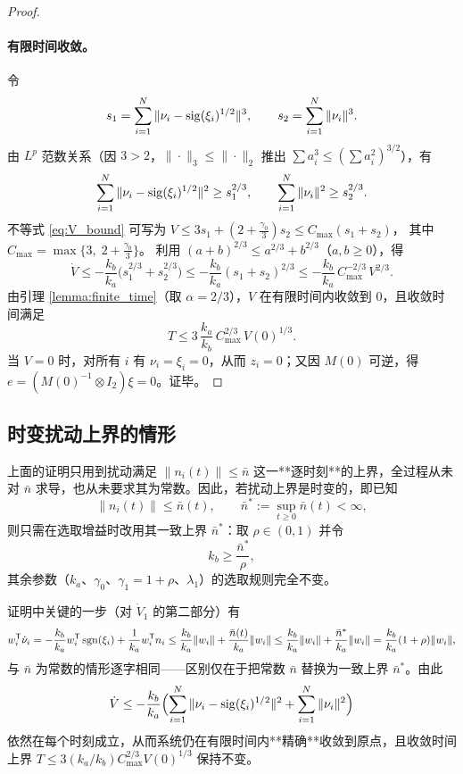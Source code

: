 \begin{proof}
    \paragraph{有限时间收敛。}
    令
    \[
        s_1 = \sum_{i=1}^{N}\|\nu_i - \operatorname{sig}(\xi_i)^{1/2}\|^3,
        \qquad
        s_2 = \sum_{i=1}^{N}\|\nu_i\|^3 .
    \]
    由 $L^p$ 范数关系（因 $3>2$，$\|\cdot\|_3\le \|\cdot\|_2$ 推出 $\sum a_i^3 \le (\sum a_i^2)^{3/2}$），有
    \[
    \sum_{i=1}^{N}\|\nu_i - \operatorname{sig}(\xi_i)^{1/2}\|^2 \ge s_1^{2/3},\qquad 
    \sum_{i=1}^{N}\|\nu_i\|^2 \ge s_2^{2/3}.
    \]
    不等式 \eqref{eq:V_bound} 可写为 $V \le 3 s_1 + (2+\frac{\gamma_0}{3}) s_2 \le C_{\max}(s_1+s_2)$，
    其中 $C_{\max} = \max\{3,\;2+\frac{\gamma_0}{3}\}$。
    利用 $(a+b)^{2/3} \le a^{2/3}+b^{2/3}$（$a,b\ge 0$），得
    \[
    \dot V \le -\frac{k_b}{k_a}\bigl(s_1^{2/3}+s_2^{2/3}\bigr)
           \le -\frac{k_b}{k_a}(s_1+s_2)^{2/3}
           \le -\frac{k_b}{k_a}\,C_{\max}^{-2/3}\,V^{2/3}.
    \]
    由引理 \ref{lemma:finite_time}（取 $\alpha=2/3$），$V$ 在有限时间内收敛到 $0$，且收敛时间满足
    \begin{equation}
        T \le 3\,\frac{k_a}{k_b}\,C_{\max}^{2/3}\,V(0)^{1/3}.
    \end{equation}
    当 $V=0$ 时，对所有 $i$ 有 $\nu_i = \xi_i = 0$，从而 $z_i=0$；又因 $M(0)$ 可逆，得 $e = (M(0)^{-1}\otimes I_2)\xi = 0$。证毕。
\end{proof}

\subsection{时变扰动上界的情形}

上面的证明只用到扰动满足 $\|n_i(t)\|\le \bar n$ 这一**逐时刻**的上界，全过程从未对 $\bar n$ 求导，也从未要求其为常数。因此，若扰动上界是时变的，即已知
\[
    \|n_i(t)\|\le \bar n(t),\qquad \bar n^*:=\sup_{t\ge 0}\bar n(t)<\infty,
\]
则只需在选取增益时改用其一致上界 $\bar n^*$：取 $\rho\in(0,1)$ 并令
\[
    k_b\ge \frac{\bar n^*}{\rho},
\]
其余参数（$k_a$、$\gamma_0$、$\gamma_1=1+\rho$、$\lambda_1$）的选取规则完全不变。

证明中关键的一步（对 $\dot V_1$ 的第二部分）有
\[
    w_i^\mathsf{T}\dot\nu_i
    =-\frac{k_b}{k_a}w_i^\mathsf{T}\operatorname{sgn}(\xi_i)+\frac{1}{k_a}w_i^\mathsf{T}n_i
    \le \frac{k_b}{k_a}\|w_i\|+\frac{\bar n(t)}{k_a}\|w_i\|
    \le \frac{k_b}{k_a}\|w_i\|+\frac{\bar n^*}{k_a}\|w_i\|
    =\frac{k_b}{k_a}(1+\rho)\|w_i\|,
\]
与 $\bar n$ 为常数的情形逐字相同——区别仅在于把常数 $\bar n$ 替换为一致上界 $\bar n^*$。由此
\[
    \dot V\le -\frac{k_b}{k_a}\Bigl(\sum_{i=1}^{N}\|\nu_i-\operatorname{sig}(\xi_i)^{1/2}\|^2+\sum_{i=1}^{N}\|\nu_i\|^2\Bigr)
\]
依然在每个时刻成立，从而系统仍在有限时间内**精确**收敛到原点，且收敛时间上界 $T\le 3(k_a/k_b)C_{\max}^{2/3}V(0)^{1/3}$ 保持不变。

